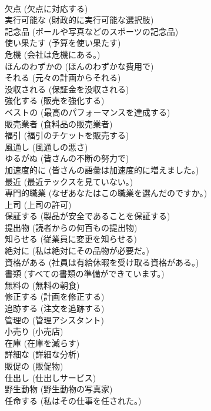 \documentclass[8pt]{extreport}
\begin{document}
\begin{CJK}{UTF8}{min}
\\	欠点	(欠点に対応する)		
\\	実行可能な	(財政的に実行可能な選択肢)		
\\	記念品	(ボールや写真などのスポーツの記念品)		
\\	使い果たす	(予算を使い果たす)		
\\	危機	(会社は危機にある。)		
\\	ほんのわずかの	(ほんのわずかな費用で)		
\\	それる	(元々の計画からそれる)		
\\	没収される	(保証金を没収される)		
\\	強化する	(販売を強化する)		
\\	ベストの	(最高のパフォーマンスを達成する)		
\\	販売業者	(食料品の販売業者)		
\\	福引	(福引のチケットを販売する)		
\\	風通し	(風通しの悪さ)		
\\	ゆるがぬ	(皆さんの不断の努力で)		
\\	加速度的に	(皆さんの語彙は加速度的に増えました。)		
\\	最近	(最近テックスを見ていない。)		
\\	専門的職業	(なぜあなたはこの職業を選んだのですか。)		
\\	上司	(上司の許可)		
\\	保証する	(製品が安全であることを保証する)		
\\	提出物	(読者からの何百もの提出物)		
\\	知らせる	(従業員に変更を知らせる)		
\\	絶対に	(私は絶対にその品物が必要だ。)		
\\	資格がある	(社員は有給休暇を受け取る資格がある。)		
\\	書類	(すべての書類の準備ができています。)		
\\	無料の	(無料の朝食)		
\\	修正する	(計画を修正する)		
\\	追跡する	(注文を追跡する)		
\\	管理の	(管理アシスタント)		
\\	小売り	(小売店)		
\\	在庫	(在庫を減らす)		
\\	詳細な	(詳細な分析)		
\\	販促の	(販促物)		
\\	仕出し	(仕出しサービス)		
\\	野生動物	(野生動物の写真家)		
\\	任命する	(私はその仕事を任された。)		

\end{CJK}
\end{document}

